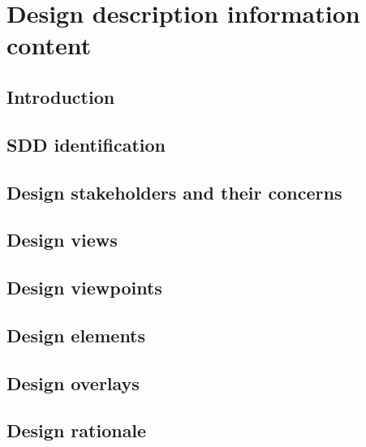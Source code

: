 \documentclass[letterpaper, 10pt, draftclsnofoot, compsoc, onecolumn]{IEEEtran}
\begin{document}
\section{Design description information content}
{\noindent \par}

\subsection{Introduction}
{\noindent \par}

\subsection{SDD identification}
{\noindent \par}

\subsection{Design stakeholders and their concerns}
{\noindent \par}

\subsection{Design views}
{\noindent \par}

\subsection{Design viewpoints}
{\noindent \par}

\subsection{Design elements}
{\noindent \par}

\subsection{Design overlays}
{\noindent \par}

\subsection{Design rationale}
{\noindent \par}
\end{document}
